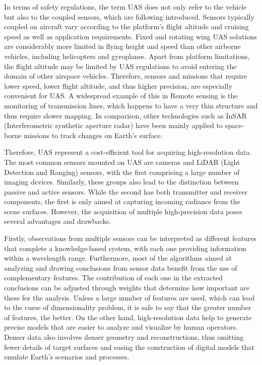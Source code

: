 In terms of safety regulations, the term UAS does not only refer to the vehicle but also to the coupled sensors, which are following introduced. Sensors typically coupled on aircraft vary according to the platform's flight altitude and cruising speed as well as application requirements. Fixed and rotating wing UAS solutions are considerably more limited in flying height and speed than other airborne vehicles, including helicopters and gyroplanes. Apart from platform limitations, the flight altitude may be limited by UAS regulations to avoid entering the domain of other airspace vehicles. Therefore, sensors and missions that require lower speed, lower flight altitude, and thus higher precision, are especially convenient for UAS. A widespread example of this in \gls{Remote sensing} is the monitoring of transmission lines, which happens to have a very thin structure and thus require slower mapping. In comparison, other technologies such as InSAR (Interferometric synthetic aperture radar) have been mainly applied to space-borne missions to track changes on Earth's surface.

Therefore, UAS represent a cost-efficient tool for acquiring high-resolution data. The most common sensors mounted on UAS are cameras and LiDAR (Light Detection and Ranging) sensors, with the first comprising a large number of imaging devices. Similarly, these groups also lead to the distinction between passive and active sensors. While the second has both transmitter and receiver components, the first is only aimed at capturing incoming radiance from the scene surfaces. However, the acquisition of multiple high-precision data poses several advantages and drawbacks. 

Firstly, observations from multiple sensors can be interpreted as different features that complete a knowledge-based system, with each one providing information within a wavelength range. Furthermore, most of the algorithms aimed at analyzing and drawing conclusions from sensor data benefit from the use of complementary features. The contribution of each one in the extracted conclusions can be adjusted through weights that determine how important are these for the analysis. Unless a large number of features are used, which can lead to the curse of dimensionality problem, it is safe to say that the greater number of features, the better. On the other hand, high-resolution data help to generate precise models that are easier to analyze and visualize by human operators. Denser data also involves denser geometry and reconstructions, thus omitting fewer details of target surfaces and easing the construction of digital models that emulate Earth's scenarios and processes. 

